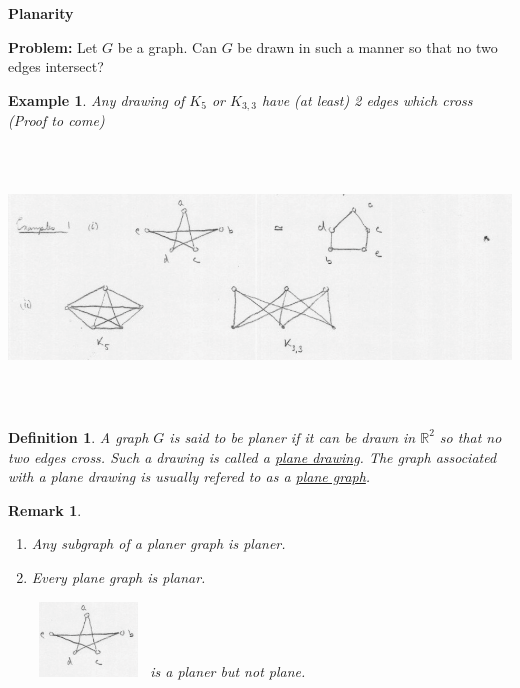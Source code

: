 \documentclass[12pt]{article}
\newtheorem{example}{Example}
\newtheorem{definition}{Definition}
\newtheorem*{remark}{Remark}
\begin{document}
\textbf{Planarity}

\textbf{Problem:} Let $G$ be a graph. Can $G$ be drawn in such a manner so that no two edges intersect?


\begin{example}

	Any drawing of $K_{5}$ or $K_{3,3}$ have (at least) 2 edges which cross (Proof to come)
	\begin{center}
		\includegraphics[width=15cm,height=7cm]{example1}
	\end{center}
\end{example}


\begin{definition}
	A graph $G$ is said to be planer if it can be drawn in $\mathbb{R}^{2}$ so that no two edges cross. Such a drawing is called a \underline{plane drawing}. The graph associated with a plane drawing is usually refered to as a \underline{plane graph}.
\end{definition}

\begin{remark}\

	\begin{enumerate}
		\item Any subgraph of a planer graph is planer.
		\item Every plane graph is planar.


		      \includegraphics[width=3cm, height=2cm]{notplane}
		      is a planer but not plane.
	\end{enumerate}

\end{remark}
\end{document}
